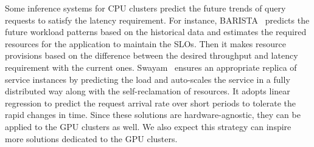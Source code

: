 Some inference systems for CPU clusters predict the future trends of query requests to satisfy the latency requirement. For instance, BARISTA~\cite{Bhattacharjee2019BARISTA} predicts the future workload patterns based on the historical data and estimates the required resources for the application to maintain the SLOs. Then it makes resource provisions based on the difference between the desired throughput and latency requirement with the current ones. Swayam~\cite{gujarati2017Swayam} ensures an appropriate replica of service instances by predicting the load and auto-scales the service in a fully distributed way along with the self-reclamation of resources. It adopts linear regression to predict the request arrival rate over short periods to tolerate the rapid changes in time. Since these solutions are hardware-agnostic, they can be applied to the GPU clusters as well. We also expect this strategy can inspire more solutions dedicated to the GPU clusters.


